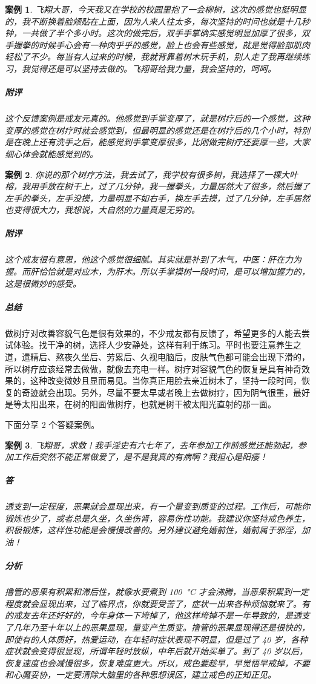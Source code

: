 \documentclass{ctexart}
\newtheorem{case}{案例}
\begin{document}
\begin{case}
    飞翔大哥，今天我又在学校的校园里抱了一会柳树，这次的感觉也挺明显的，我不断换着脸颊贴在上面，因为人来人往太多，每次坚持的时间也就是十几秒钟，一共做了半个多小时。这次的做完后，双手手掌确实感觉明显加厚了很多，双手握拳的时候手心会有一种肉乎乎的感觉，脸上也会有些感觉，就是觉得脸部肌肉轻松了不少。每当有人过来的时候，我就背靠着树木玩手机，别人走了我再继续练习，我觉得还是可以坚持去做的。飞翔哥给我力量，我会坚持的，呵呵。

    \subparagraph{附评} 这个反馈案例是戒友元真的。他感觉到手掌变厚了，就是树疗后的一个感觉，这种变厚的感觉在树疗时就会感觉到，但最明显的感觉还是在树疗后的几个小时，特别是在晚上还有洗手之后，能感觉到手掌变厚很多，比刚做完树疗还要厚一些，大家细心体会就能感觉到的。
\end{case}

\begin{case}
    你说的那个树疗方法，我去试了，我学校有很多树，我选择了一棵大叶榕，我用手放在树干上，过了几分钟，我一握拳头，力量居然大了很多，然后握了左手的拳头，左手没摸，力量明显不如右手，换左手去摸，过了几分钟，左手居然也变得很大力，我想说，大自然的力量真是无穷的。

    \subparagraph{附评} 这个戒友很有意思，他这个感觉很细腻。其实就是补到了木气，中医：肝在力为握。而肝恰恰就是对应木，为肝木。所以手掌摸树一段时间，是可以增加握力的，这是很微妙的感受。
\end{case}

\subparagraph{总结} 做树疗对改善容貌气色是很有效果的，不少戒友都有反馈了，希望更多的人能去尝试体验。找干净的树，选择人少安静处，这样有利于练习。平时也要注意养生之道，遗精后、熬夜久坐后、劳累后、久视电脑后，皮肤气色都可能会出现下滑的，所以树疗应该经常去做做，就像去充电一样。树疗对容貌气色的恢复是具有神奇效果的，这种改变微妙且显而易见。当你真正用脸去亲近树木了，坚持一段时间，恢复的奇迹就会出现。另外，尽量不要太早或者晚上去做树疗，因为阴气很重，最好是等太阳出来，在树的阳面做树疗，也就是树干被太阳光直射的那一面。

下面分享 2 个答疑案例。

\begin{case}
    飞翔哥，求救！我手淫史有六七年了，去年参加工作前感觉还能勃起，参加工作后突然不能正常做爱了，是不是我真的有病啊？我担心是阳痿！
    \subparagraph{答} 透支到一定程度，恶果就会显现出来，有一个量变到质变的过程。工作后，可能你锻炼也少了，或者总是久坐，久坐伤肾，容易伤性功能。我建议你坚持戒色养生，积极锻炼，这样性功能是会慢慢改善的。另外建议避免婚前性，婚前属于邪淫，加油！
    \subparagraph{分析} 撸管的恶果有积累和滞后性，就像水要煮到 \SI{100}{\degreeCelsius} 才会沸腾，当恶果积累到一定程度就会显现出来，过了临界点，你就要受苦了，症状一出来各种烦恼就来了。有的戒友去年还好好的，今年身体一下垮掉了，他这样垮掉不是一年导致的，是透支了几年乃至十年以上的恶果显现，量变产生质变。撸管的恶果显现得还是很快的，即使有的人体质好，热爱运动，在年轻时症状表现不明显，但是过了 40 岁，各种症状就会变得很显现，所谓年轻时放纵，中年后就开始买单了。到了 40 岁以后，恢复速度也会减慢很多，恢复难度更大。所以，戒色要趁早，早觉悟早戒掉，不要和心魔妥协，一定要清除大脑里的各种思想误区，建立戒色的正知正见。
\end{case}
\end{document}
